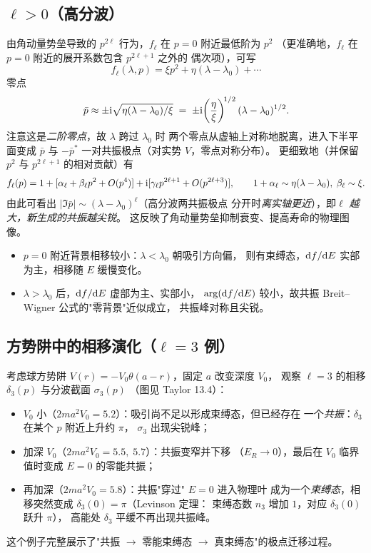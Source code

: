 \subsection{$\ell>0$（高分波）}

由角动量势垒导致的 $p^{2\ell}$ 行为，$f_\ell$ 在 $p=0$ 附近最低阶为 $p^2$
（更准确地，$f_\ell$ 在 $p=0$ 附近的展开系数包含 $p^{2\ell+1}$ 之外的
偶次项），可写
\begin{equation}
  f_\ell(\lambda,p)=\xi p^2+\eta(\lambda-\lambda_0)+\cdots
\end{equation}
零点
\begin{equation}\label{eq:res-pair}
  \bar p\approx \pm \mathrm{i}\sqrt{\eta(\lambda-\lambda_0)/\xi}
  \;=\;\pm \mathrm{i}\!\left(\frac{\eta}{\xi}\right)^{\!1/2}(\lambda-\lambda_0)^{1/2}.
\end{equation}
注意这是\emph{二阶零点}，故 $\lambda$ 跨过 $\lambda_0$ 时
两个零点从虚轴上对称地脱离，进入下半平面变成
$\bar p$ 与 $-\bar p^*$ 一对共振极点（对实势 $V$，零点对称分布）。
更细致地（并保留 $p^2$ 与 $p^{2\ell+1}$ 的相对贡献）有
\begin{equation}
  f_\ell(p)=1+[\alpha_\ell+\beta_\ell p^2+O(p^4)]+\mathrm{i}[\gamma_\ell p^{2\ell+1}+O(p^{2\ell+3})],
  \qquad 1+\alpha_\ell\sim\eta(\lambda-\lambda_0),\;\beta_\ell\sim\xi.
\end{equation}
由此可看出 $|\Im\bar p|\sim(\lambda-\lambda_0)^\ell$（高分波两共振极点
分开时\emph{离实轴更近}），即\emph{$\ell$ 越大，新生成的共振越尖锐}。
这反映了角动量势垒抑制衰变、提高寿命的物理图像。

\begin{itemize}
  \item $p=0$ 附近背景相移较小：$\lambda<\lambda_0$ 朝吸引方向偏，
    则有束缚态，$\mathrm{d} f/\mathrm{d} E$ 实部为主，相移随 $E$ 缓慢变化。
  \item $\lambda>\lambda_0$ 后，$\mathrm{d} f/\mathrm{d} E$ 虚部为主、实部小，
    $\arg(\mathrm{d} f/\mathrm{d} E)$ 较小，故共振 Breit--Wigner 公式的"零背景"近似成立，
    共振峰对称且尖锐。
\end{itemize}

\subsection{方势阱中的相移演化（$\ell=3$ 例）}

考虑球方势阱 $V(r)=-V_0\theta(a-r)$，固定 $a$ 改变深度 $V_0$，
观察 $\ell=3$ 的相移 $\delta_3(p)$ 与分波截面 $\sigma_3(p)$
（图见 Taylor 13.4）：
\begin{itemize}
  \item $V_0$ 小（$2ma^2 V_0=5.2$）：吸引尚不足以形成束缚态，但已经存在
    一个\emph{共振}：$\delta_3$ 在某个 $p$ 附近上升约 $\pi$，
    $\sigma_3$ 出现尖锐峰；
  \item 加深 $V_0$（$2ma^2 V_0=5.5,\;5.7$）：共振变窄并下移
    （$E_R\to 0$），最后在 $V_0$ 临界值时变成 $E=0$ 的零能共振；
  \item 再加深（$2ma^2 V_0=5.8$）：共振"穿过" $E=0$ 进入物理叶
    成为一个\emph{束缚态}，相移突然变成 $\delta_3(0)=\pi$（Levinson 定理：
    束缚态数 $n_3$ 增加 $1$，对应 $\delta_3(0)$ 跃升 $\pi$），
    高能处 $\delta_3$ 平缓不再出现共振峰。
\end{itemize}
这个例子完整展示了"共振 $\to$ 零能束缚态 $\to$ 真束缚态"的极点迁移过程。

